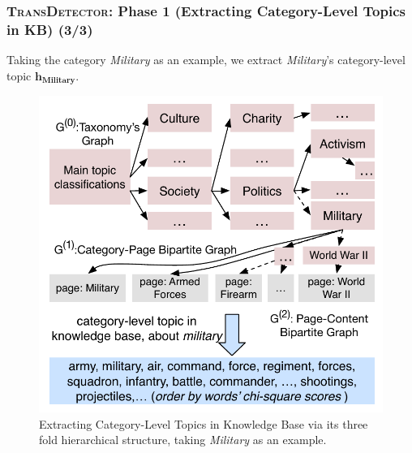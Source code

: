 \documentclass{beamer}
\begin{document}
\begin{frame}
\frametitle{\textsc{TransDetector}: Phase 1 (Extracting Category-Level Topics in KB) (3/3)}	
Taking the category \textit{Military} as an example, we extract \textit{Military}'s category-level topic \(\bm{h_{Military}}\).
\begin{figure}[h]
		\setlength{\abovecaptionskip}{0.cm}
        \setlength{\belowcaptionskip}{0.cm}
        \centering
        \includegraphics[width=0.45\columnwidth]{img/initializationExample.pdf}
        \caption{Extracting Category-Level Topics in Knowledge Base via its three fold hierarchical structure, taking \textit{Military} as an example.}
        \label{fig:hood}
\end{figure}

\end{frame}
\end{document}
